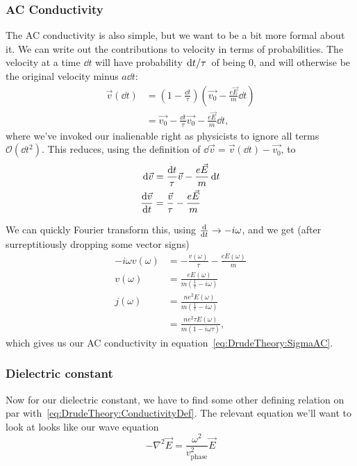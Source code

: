 \documentclass[../main.tex]{subfiles}
\newcommand{\del}{\nabla}
\begin{document}
	\subsubsection{AC Conductivity}

	The AC conductivity is also simple, but we want to be a bit more formal about it.
	We can write out the contributions to velocity in terms of probabilities.
	The velocity at a time $\dd{t}$ will have probability $\flatfrac{\dd{t}}{\tau}$ of being $0$, and will otherwise be the original velocity minus $a \dd{t}$:
	\begin{align}
		\vec{v}(\dd{t}) &= \left(1 - \frac{\dd{t}}{\tau}\right) \left(\vec{v_0} - \frac{e \vec{E}}{m} \dd{t} \right) \\
		&= \vec{v_0} - \frac{\dd{t}}{\tau}\vec{v_0} - \frac{e \vec{E}}{m} \dd{t},
	\end{align}
	where we've invoked our inalienable right as physicists to ignore all terms $\mathcal{O}(\dd{t}^2)$.
	This reduces, using the definition of $\dd{\vec{v}} = \vec{v}(\dd{t}) - \vec{v_0}$, to
	\begin{align}
		\dd{\vec{v}} &=  \frac{\dd{t}}{\tau} \vec{v} - \frac{e \vec{E}}{m} \dd{t} \\
		\dv{\vec{v}}{t} &= \frac{\vec{v}}{\tau} - \frac{e \vec{E}}{m}
	\end{align}

	We can quickly Fourier transform this, using $\dv{}{t} \rightarrow -i \omega$, and we get (after surreptitiously dropping some vector signs)
	\begin{align}
		-i \omega v(\omega) &= - \frac{v(\omega)}{\tau} - \frac{e E(\omega)}{m} \\
		v(\omega) &= \frac{e E(\omega)}{m \left(\frac{1}{\tau} - i\omega \right)} \\
		j(\omega) &= \frac{n e^2 E(\omega)}{m \left(\frac{1}{\tau} - i\omega \right)} \\
		&= \frac{n e^2 \tau E(\omega)}{m \left(1 - i\omega \tau \right)},
	\end{align}
	which gives us our AC conductivity in equation~\eqref{eq:DrudeTheory:SigmaAC}.

	\subsubsection{Dielectric constant}

	Now for our dielectric constant, we have to find some other defining relation on par with~\eqref{eq:DrudeTheory:ConductivityDef}.
	The relevant equation we'll want to look at looks like our wave equation
	\begin{equation}
		-\del^2 \vec{E} = \frac{\omega^2}{v_{\textrm{phase}}^2} \vec{E}
	\end{equation}
\end{document}

